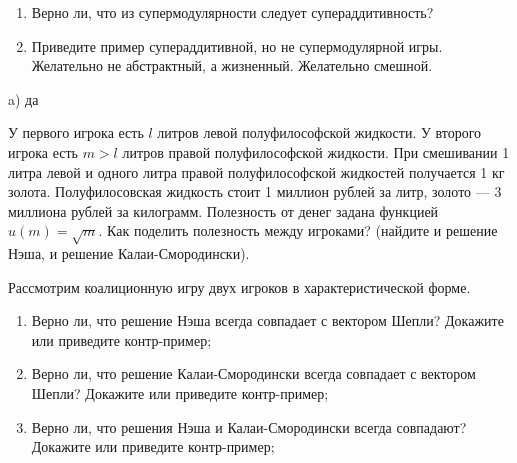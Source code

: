 \begin{problem}

\begin{enumerate}

\item Верно ли, что из супермодулярности следует супераддитивность?

\item Приведите пример супераддитивной, но не супермодулярной игры. Желательно не абстрактный, а жизненный. Желательно смешной.
\end{enumerate}


\begin{sol}
\begin{enumerate}
a) да
\end{enumerate}
\end{sol}
\end{problem}





\begin{problem}
 У первого игрока есть $l$ литров левой полуфилософской
жидкости. У второго игрока есть $m>l$ литров правой полуфилософской
жидкости. При смешивании 1 литра левой и одного литра правой полуфилософской
жидкостей получается 1 кг золота. Полуфилосовская жидкость стоит 1 миллион
рублей за литр, золото --- 3 миллиона рублей за килограмм. Полезность от денег
задана функцией $u(m)=\sqrt{m}$. Как поделить полезность между игроками?
(найдите и решение Нэша, и решение Калаи-Смородински).



\begin{sol}

\end{sol}
\end{problem}



\begin{problem}

 Рассмотрим коалиционную игру двух игроков в характеристической
форме.

\begin{enumerate}
\item Верно ли, что решение Нэша всегда совпадает с вектором Шепли? Докажите
или приведите контр-пример;

\item Верно ли, что решение Калаи-Смородински всегда совпадает с вектором
Шепли? Докажите или приведите контр-пример;

\item Верно ли, что решения Нэша и Калаи-Смородински всегда совпадают? Докажите
или приведите контр-пример;
\end{enumerate}



\begin{sol}

\end{sol}
\end{problem}



